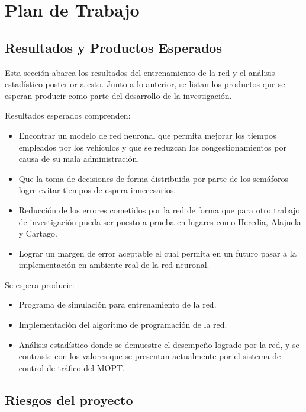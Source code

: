 \chapter{Plan de Trabajo}
	\label{chap:work}
	
	\section{Resultados y Productos Esperados}
	
	Esta secci\'{o}n abarca los resultados del entrenamiento de la red y el
an\'{a}lisis estad\'{i}stico posterior a esto. Junto a lo anterior, se listan
los productos que se esperan producir como parte del desarrollo de la
investigaci\'{o}n.
	
Resultados esperados comprenden:
	\begin{itemize}
	  \item Encontrar un modelo de red neuronal que permita mejorar los tiempos
	  empleados por los veh\'{i}culos y que se reduzcan los congestionamientos por
	  causa de su mala administraci\'{o}n.
	  \item Que la toma de decisiones de forma distribuida por parte de los
	  sem\'{a}foros logre evitar tiempos de espera innecesarios. 
	  \item Reducci\'{o}n de los errores cometidos por la red de forma que para
	  otro trabajo de investigaci\'{o}n pueda ser puesto a prueba en lugares como
	  Heredia, Alajuela y Cartago.
	  \item Lograr un margen de error aceptable el cual permita en un futuro pasar
	  a la implementaci\'{o}n en ambiente real de la red neuronal.
	\end{itemize}

Se espera producir:
	\begin{itemize}
	  \item Programa de simulaci\'{o}n para entrenamiento de la red.
	  \item Implementaci\'{o}n del algoritmo de programaci\'{o}n de la red.
	  \item An\'{a}lisis estad\'{i}stico donde se demuestre el desempe\~{n}o
	  logrado por la red, y se contraste con los valores que se presentan actualmente por
	  el sistema de control de tr\'{a}fico del MOPT.\\
	\end{itemize}
	
	
	
	\section{Riesgos del proyecto}
	
